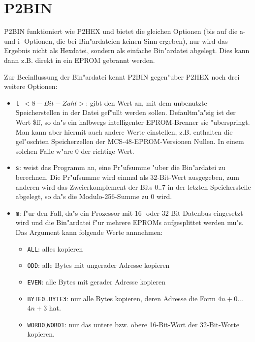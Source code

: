 \documentclass[12pt,a4paper,twoside]{report}
\newcommand{\tty}[1]{{\tt #1}}
\begin{document}

\section{P2BIN}

P2BIN funktioniert wie P2HEX und bietet die gleichen Optionen (bis
auf die a- und i- Optionen, die bei Bin"ardateien keinen Sinn ergeben), nur
wird das Ergebnis nicht als Hexdatei, sondern als einfache Bin"ardatei
abgelegt.  Dies kann dann z.B. direkt in ein EPROM gebrannt werden.
\par
Zur Beeinflussung der Bin"ardatei kennt P2BIN gegen"uber P2HEX noch
drei weitere Optionen:
\begin{itemize}
\item{\tty{l $<8-Bit-Zahl>$}: gibt den Wert an, mit dem unbenutzte
      Speicherstellen in der Datei gef"ullt werden sollen.
      Defaultm"a"sig ist der Wert \$ff, so da"s ein halbwegs
      intelligenter EPROM-Brenner sie "uberspringt.  Man kann aber
      hiermit auch andere Werte einstellen, z.B. enthalten die gel"oschten
      Speicherzellen der MCS-48-EPROM-Versionen Nullen.  In einem solchen
      Falle w"are 0 der richtige Wert.}
\item{\tty{s}: weist das Programm an, eine Pr"ufsumme "uber die Bin"ardatei zu
      berechnen.  Die Pr"ufsumme wird einmal als 32-Bit-Wert ausgegeben,
      zum anderen wird das Zweierkomplement der Bits 0..7 in der letzten
      Speicherstelle abgelegt, so da"s die Modulo-256-Summe zu 0 wird.}
\item{\tty{m}:  f"ur den Fall, da"s ein Prozessor mit 16- oder 32-Bit-Datenbus
      eingesetzt wird und die Bin"ardatei f"ur mehrere EPROMs aufgesplittet
      werden mu"s.  Das Argument kann folgende Werte annnehmen:
      \begin{itemize}
      \item{\tty{ALL}: alles kopieren}
      \item{\tty{ODD}: alle Bytes mit ungerader Adresse kopieren}
      \item{\tty{EVEN}: alle Bytes mit gerader Adresse kopieren}
      \item{\tty{BYTE0}..\tty{BYTE3}: nur alle Bytes kopieren, deren Adresse die Form
            $4n+0$...$4n+3$ hat.}
      \item{\tty{WORD0},\tty{WORD1}: nur das untere bzw. obere 16-Bit-Wort der
            32-Bit-Worte kopieren.}
      \end{itemize}}
\end{itemize}
\end{document}
